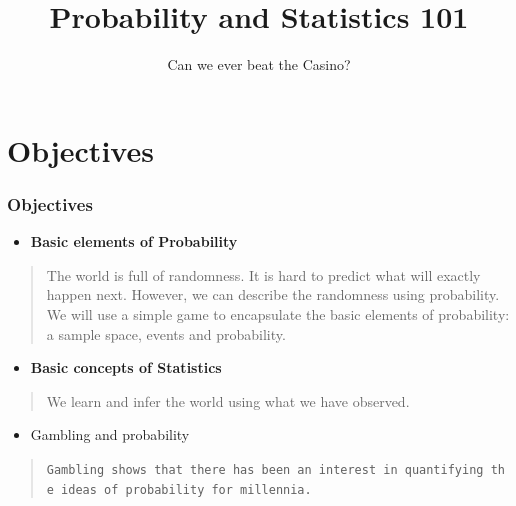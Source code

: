 \documentclass[
  ignorenonframetext,
]{beamer}
\title{Probability and Statistics 101}
\subtitle{Can we ever beat the Casino?}
\author{}
\date{\vspace{-2.5em}}
\providecommand{\tightlist}{%
  \setlength{\itemsep}{0pt}\setlength{\parskip}{0pt}}
\begin{document}
\frame{\titlepage}

\hypertarget{objectives}{%
\section{Objectives}\label{objectives}}

\begin{frame}[fragile]
\frametitle{Objectives}

\begin{itemize}
\tightlist
\item
  \textbf{Basic elements of Probability}
\end{itemize}

\begin{quote}
The world is full of randomness. It is hard to predict what will exactly
happen next. However, we can describe the randomness using probability.
We will use a simple game to encapsulate the basic elements of
probability: a sample space, events and probability.
\end{quote}

\begin{itemize}
\tightlist
\item
  \textbf{Basic concepts of Statistics}
\end{itemize}

\begin{quote}
We learn and infer the world using what we have observed.
\end{quote}

\begin{itemize}
\tightlist
\item
  Gambling and probability
\end{itemize}

\begin{quote}
\texttt{Gambling\ shows\ that\ there\ has\ been\ an\ interest\ in\ quantifying\ the\ ideas\ of\ probability\ for\ millennia.}
\end{quote}
\end{frame}
\end{document}
